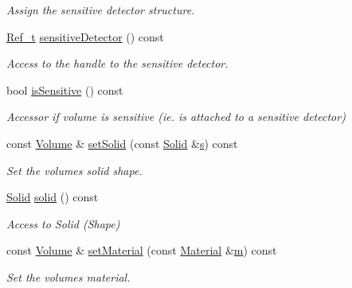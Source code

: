 \begin{DoxyCompactItemize}
\begin{DoxyCompactList}\small\item\em Assign the sensitive detector structure. \end{DoxyCompactList}\item 
\hyperlink{group___d_d4_h_e_p___g_e_o_m_e_t_r_y_ga40af83be6718bb8828a3d83dc7f8c930}{Ref\+\_\+t} \hyperlink{class_d_d4hep_1_1_geometry_1_1_volume_a094839ee3155de449a36ca927ec17d2d}{sensitive\+Detector} () const
\begin{DoxyCompactList}\small\item\em Access to the handle to the sensitive detector. \end{DoxyCompactList}\item 
bool \hyperlink{class_d_d4hep_1_1_geometry_1_1_volume_aa324bff4bb7c4e5a4575f81819d78d48}{is\+Sensitive} () const
\begin{DoxyCompactList}\small\item\em Accessor if volume is sensitive (ie. is attached to a sensitive detector) \end{DoxyCompactList}\item 
const \hyperlink{class_d_d4hep_1_1_geometry_1_1_volume}{Volume} \& \hyperlink{class_d_d4hep_1_1_geometry_1_1_volume_aa5dcda1294e6530db08491bd6ab346bf}{set\+Solid} (const \hyperlink{namespace_d_d4hep_1_1_geometry_a83de90a8dcc7378ba47d54ef9a6a687b}{Solid} \&\hyperlink{_volumes_8cpp_a17ca6bfc8040d695d3cada22a4763d40}{s}) const
\begin{DoxyCompactList}\small\item\em Set the volume\textquotesingle{}s solid shape. \end{DoxyCompactList}\item 
\hyperlink{namespace_d_d4hep_1_1_geometry_a83de90a8dcc7378ba47d54ef9a6a687b}{Solid} \hyperlink{class_d_d4hep_1_1_geometry_1_1_volume_a1138a74be0df117ce0835711b37efa33}{solid} () const
\begin{DoxyCompactList}\small\item\em Access to Solid (Shape) \end{DoxyCompactList}\item 
const \hyperlink{class_d_d4hep_1_1_geometry_1_1_volume}{Volume} \& \hyperlink{class_d_d4hep_1_1_geometry_1_1_volume_a504c43593cf73afe34c0b4c73d5fd662}{set\+Material} (const \hyperlink{class_d_d4hep_1_1_geometry_1_1_material}{Material} \&\hyperlink{_volumes_8cpp_a6fc379aaec47ce424b00d8ffda2a6c59}{m}) const
\begin{DoxyCompactList}\small\item\em Set the volume\textquotesingle{}s material. \end{DoxyCompactList}\item 

\end{DoxyCompactItemize}

